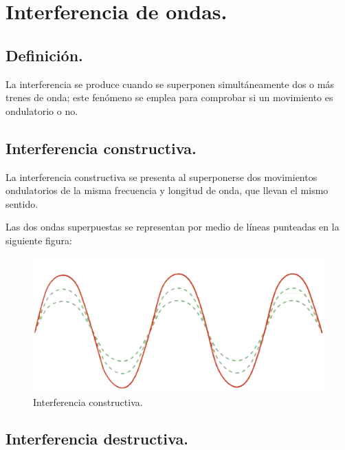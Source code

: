 \documentclass[12pt, letter]{article}
\begin{document}
\section{Interferencia de ondas.}

\subsection{Definición.}

La interferencia se produce cuando se superponen simultáneamente dos o más trenes de onda; este fenómeno se emplea para comprobar si un movimiento es ondulatorio o no.

\subsection{Interferencia constructiva.}

La interferencia constructiva se presenta al superponerse dos movimientos ondulatorios de la misma frecuencia y longitud de onda, que llevan el mismo sentido.

Las dos ondas superpuestas se representan por medio de líneas punteadas en la siguiente figura:
\begin{figure}[H]
    \centering
    \includegraphics[scale=0.8]{Imagenes/Onda_Constructiva.png}
    \caption{Interferencia constructiva.}
\end{figure}


\subsection{Interferencia destructiva.}
\end{document}
